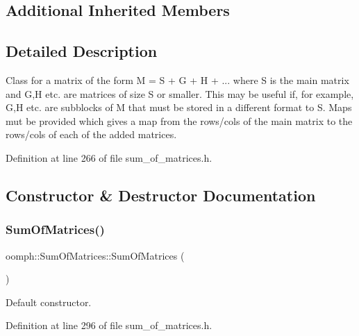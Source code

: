 \subsection*{Additional Inherited Members}


\subsection{Detailed Description}
Class for a matrix of the form M = S + G + H + ... where S is the main matrix and G,H etc. are matrices of size S or smaller. This may be useful if, for example, G,H etc. are subblocks of M that must be stored in a different format to S. Maps mut be provided which gives a map from the rows/cols of the main matrix to the rows/cols of each of the added matrices. 

Definition at line 266 of file sum\+\_\+of\+\_\+matrices.\+h.



\subsection{Constructor \& Destructor Documentation}
\mbox{\label{classoomph_1_1SumOfMatrices_a627e945a69e2ba0709678e3ac0f8f195}} 
\subsubsection{\texorpdfstring{Sum\+Of\+Matrices()}{SumOfMatrices()}\hspace{0.1cm}{\footnotesize\ttfamily [1/3]}}
{\footnotesize\ttfamily oomph\+::\+Sum\+Of\+Matrices\+::\+Sum\+Of\+Matrices (\begin{DoxyParamCaption}{ }\end{DoxyParamCaption})\hspace{0.3cm}{\ttfamily [inline]}}



Default constructor. 



Definition at line 296 of file sum\+\_\+of\+\_\+matrices.\+h.

\mbox{\label{classoomph_1_1SumOfMatrices_a1d482525c8a83e339b729c43667ca1a3}} 
